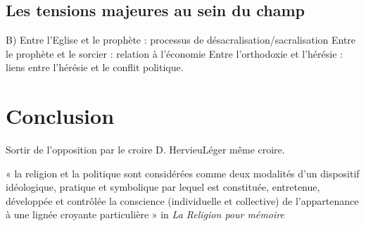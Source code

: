       
      \subsection{ Les tensions majeures au sein du champ }
      B) Entre l’Eglise et le prophète : processus de désacralisation/sacralisation Entre le prophète et le sorcier : relation à l’économie Entre l’orthodoxie et l’hérésie : liens entre l’hérésie et le conflit politique.      
      
      
      \section{Conclusion}
      
      Sortir de l’opposition par le croire D. HervieuLéger même croire. 
      
      \begin{Def}[Le croire]
         « la religion et la politique sont considérées comme deux modalités d’un dispositif idéologique, pratique et symbolique par lequel est constituée, entretenue, développée et contrôlée la conscience (individuelle et collective) de l’appartenance à une lignée croyante particulière » in \textit{La Religion pour mémoire }
      \end{Def}   
